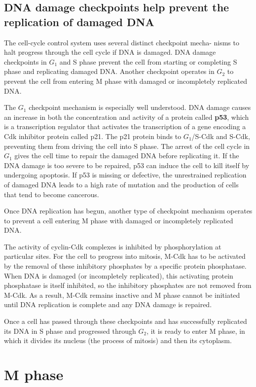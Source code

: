 \subsection{DNA damage checkpoints help prevent the replication of damaged DNA}

The cell-cycle control system uses several distinct checkpoint mecha-
nisms to halt progress through the cell cycle if DNA is damaged. DNA
damage checkpoints in $G_1$ and S phase prevent the cell from starting or
completing S phase and replicating damaged DNA. Another checkpoint
operates in $G_2$ to prevent the cell from entering M phase with damaged
or incompletely replicated DNA.

The $G_1$ checkpoint mechanism is especially well understood. DNA damage
causes an increase in both the concentration and activity of a protein
called \textbf{p53}, which is a transcription regulator that activates the transcription
of a gene encoding a Cdk inhibitor protein called p21. The p21
protein binds to $G_1$/S-Cdk and S-Cdk, preventing them from driving the
cell into S phase. The arrest of the cell cycle in $G_1$ gives
the cell time to repair the damaged DNA before replicating it. If the DNA
damage is too severe to be repaired, p53 can induce the cell to kill itself
by undergoing apoptosis. If p53 is missing or defective, the unrestrained
replication of damaged DNA leads to a high rate of mutation and the production
of cells that tend to become cancerous.

Once DNA replication has begun, another type of checkpoint mechanism
operates to prevent a cell entering M phase with damaged or
incompletely replicated DNA.

The activity of cyclin-Cdk complexes is inhibited by phosphorylation at particular sites.
For the cell to progress into mitosis, M-Cdk has to be activated by the
removal of these inhibitory phosphates by a specific protein phosphatase.
When DNA is damaged (or incompletely replicated), this activating protein
phosphatase is itself inhibited, so the inhibitory phosphates are not
removed from M-Cdk. As a result, M-Cdk remains inactive and M phase
cannot be initiated until DNA replication is complete and any DNA damage
is repaired.

Once a cell has passed through these checkpoints and has successfully
replicated its DNA in S phase and progressed through $G_2$, it is ready to
enter M phase, in which it divides its nucleus (the process of mitosis) and
then its cytoplasm.

\section{M phase}

